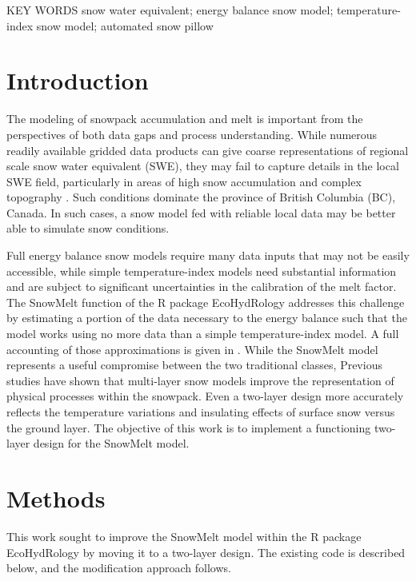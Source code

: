 \documentclass[12pt]{article}
\begin{document}
\bigskip
\noindent KEY WORDS \: snow water equivalent; energy balance snow model; temperature-index snow model; automated snow pillow

\section{Introduction}
The modeling of snowpack accumulation and melt is important from the perspectives of both data gaps and process understanding.
While numerous readily available gridded data products can give coarse representations of regional scale snow water equivalent (SWE), they may fail to capture details in the local SWE field, particularly in areas of high snow accumulation and complex topography \citep{snauffer2016comparison}.
Such conditions dominate the province of British Columbia (BC), Canada.
In such cases, a snow model fed with reliable local data may be better able to simulate snow conditions.

Full energy balance snow models require many data inputs that may not be easily accessible, while simple temperature-index models need substantial information and are subject to significant uncertainties in the calibration of the melt factor.
The SnowMelt function of the R package EcoHydRology \citep{fuka2014ecohydrology} addresses this challenge by estimating a portion of the data necessary to the energy balance such that the model works using no more data than a simple temperature-index model.
A full accounting of those approximations is given in \citet{walter2005process}.
While the SnowMelt model represents a useful compromise between the two traditional classes, 
Previous studies \citep{jost2012distributed} have shown that multi-layer snow models improve the representation of physical processes within the snowpack.
Even a two-layer design more accurately reflects the temperature variations and insulating effects of surface snow versus the ground layer.
The objective of this work is to implement a functioning two-layer design for the SnowMelt model.

\section{Methods}
This work sought to improve the SnowMelt model within the R package EcoHydRology \citep{fuka2014ecohydrology} by moving it to a two-layer design.
The existing code is described below, and the modification approach follows.
\end{document}

